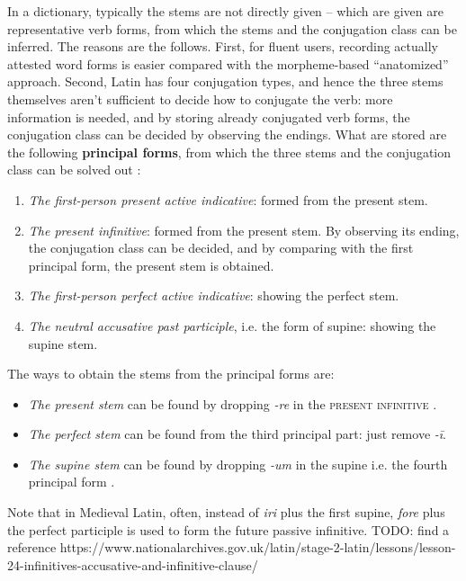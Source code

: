 \documentclass[a4paper, oneside]{report}
\newcommand*{\citesec}[1]{\S~{#1}}
\newcommand*{\concept}[1]{\textbf{#1}}
\newcommand{\form}[1]{\emph{#1}}
\newcommand*{\category}[1]{\textsc{#1}}
\begin{document}
In a dictionary, 
typically the stems are not directly given 
-- which are given are representative verb forms,
from which the stems and the conjugation class can be inferred.
The reasons are the follows.
First, for fluent users,
recording actually attested word forms is easier
compared with the morpheme-based ``anatomized'' approach.
Second, Latin has four conjugation types,
and hence the three stems themselves aren't sufficient to decide how to conjugate the verb:
more information is needed, 
and by storing already conjugated verb forms,
the conjugation class can be decided by observing the endings.
What are stored are the following \concept{principal forms},
from which the three stems and the conjugation class can be solved out
\citep[\citesec{172}]{allen1903allen}:
\begin{enumerate}
    \item \emph{The first-person present active indicative}: formed from the present stem.
    \item \emph{The present infinitive}: formed from the present stem. 
    By observing its ending, the conjugation class can be decided,
    and by comparing with the first principal form, 
    the present stem is obtained.
    \item \emph{The first-person perfect active indicative}: showing the perfect stem.
    \item \emph{The neutral accusative past participle}, i.e. the form of supine: showing the supine stem.
\end{enumerate}
The ways to obtain the stems from the principal forms are:
\begin{itemize}
    \item \emph{The present stem} can be found by dropping \form{-re} in the 
    \category{present infinitive}
    \citep[\citesec{175}]{allen1903allen}.
    \item \emph{The perfect stem} can be found from the third principal part:
    just remove \form{-ī}.
    \item \emph{The supine stem} can be found by dropping \form{-um} in the supine
    i.e. the fourth principal form
    \citep[\citesec{178}]{allen1903allen}.
\end{itemize}

Note that in Medieval Latin, often,
instead of \form{iri} plus the first supine,
\form{fore} plus the perfect participle is used to form the future passive infinitive.
TODO: find a reference https://www.nationalarchives.gov.uk/latin/stage-2-latin/lessons/lesson-24-infinitives-accusative-and-infinitive-clause/
\end{document}
